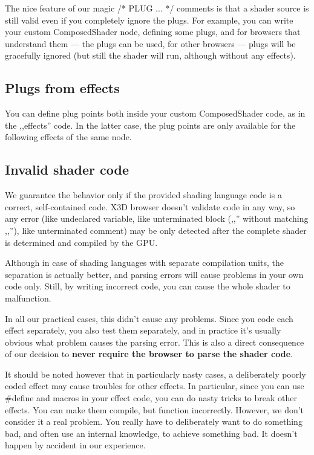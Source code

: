 \documentclass{acmsiggraph}                     %
\begin{document}
The nice feature of our magic /* PLUG ... */ comments is that a shader source
is still valid even if you completely ignore the plugs. For example,
you can write your custom ComposedShader node, defining some plugs,
and for browsers that understand them --- the plugs can be used,
for other browsers --- plugs will be gracefully ignored (but still
the shader will run, although without any effects).

\subsection{Plugs from effects}

You can define plug points both inside your custom ComposedShader code,
as in the ,,effects'' code. In the latter case, the plug points
are only available for the following effects of the same node.

\subsection{Invalid shader code}

We guarantee the behavior only if the provided shading language code
is a correct, self-contained code.
X3D browser doesn't validate code in any way, so any error (like undeclared
variable, like unterminated block (,,{'' without matching ,,}''),
like unterminated comment) may be only detected after the complete shader
is determined and compiled by the GPU.

Although in case of shading languages with separate compilation units,
the separation is actually better, and parsing errors will cause
problems in your own code only. Still, by writing incorrect code,
you can cause the whole shader to malfunction.

In all our practical cases, this didn't cause any problems.
Since you code each effect separately, you also test them separately,
and in practice it's usually obvious what problem causes the parsing error.
This is also a direct consequence of our decision to \textbf{never require
the browser to parse the shader code}.

It should be noted however that in particularly nasty cases,
a deliberately poorly coded effect may cause troubles for other effects.
In particular, since you can use \#define and macros in your effect code,
you can do nasty tricks to break other effects. You can make them compile,
but function incorrectly. However, we don't consider
it a real problem. You really have to deliberately want to do something bad,
and often use an internal knowledge, to achieve something bad.
It doesn't happen by accident in our experience.
\end{document}
